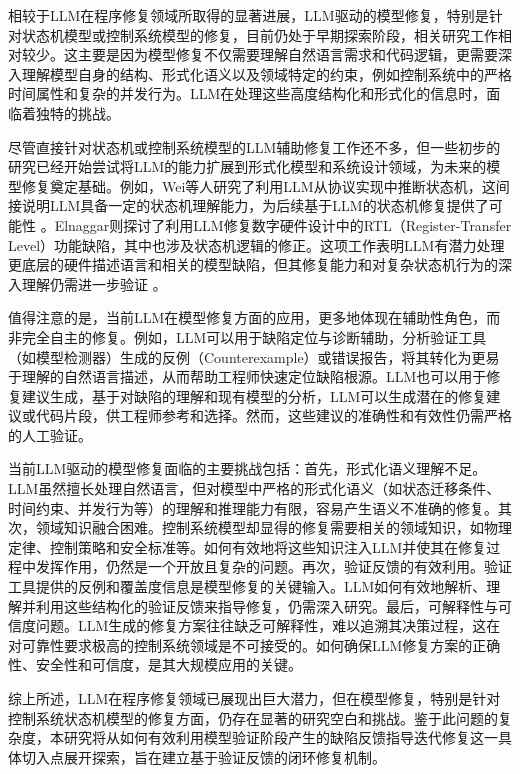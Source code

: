 相较于LLM在程序修复领域所取得的显著进展，LLM驱动的模型修复，特别是针对状态机模型或控制系统模型的修复，目前仍处于早期探索阶段，相关研究工作相对较少。这主要是因为模型修复不仅需要理解自然语言需求和代码逻辑，更需要深入理解模型自身的结构、形式化语义以及领域特定的约束，例如控制系统中的严格时间属性和复杂的并发行为。LLM在处理这些高度结构化和形式化的信息时，面临着独特的挑战。

尽管直接针对状态机或控制系统模型的LLM辅助修复工作还不多，但一些初步的研究已经开始尝试将LLM的能力扩展到形式化模型和系统设计领域，为未来的模型修复奠定基础。例如，Wei等人研究了利用LLM从协议实现中推断状态机，这间接说明LLM具备一定的状态机理解能力，为后续基于LLM的状态机修复提供了可能性 。Elnaggar则探讨了利用LLM修复数字硬件设计中的RTL（Register-Transfer Level）功能缺陷，其中也涉及状态机逻辑的修正。这项工作表明LLM有潜力处理更底层的硬件描述语言和相关的模型缺陷，但其修复能力和对复杂状态机行为的深入理解仍需进一步验证 。

值得注意的是，当前LLM在模型修复方面的应用，更多地体现在辅助性角色，而非完全自主的修复。例如，LLM可以用于缺陷定位与诊断辅助，分析验证工具（如模型检测器）生成的反例（Counterexample）或错误报告，将其转化为更易于理解的自然语言描述，从而帮助工程师快速定位缺陷根源。LLM也可以用于修复建议生成，基于对缺陷的理解和现有模型的分析，LLM可以生成潜在的修复建议或代码片段，供工程师参考和选择。然而，这些建议的准确性和有效性仍需严格的人工验证。

当前LLM驱动的模型修复面临的主要挑战包括：首先，形式化语义理解不足。LLM虽然擅长处理自然语言，但对模型中严格的形式化语义（如状态迁移条件、时间约束、并发行为等）的理解和推理能力有限，容易产生语义不准确的修复。其次，领域知识融合困难。控制系统模型却显得的修复需要相关的领域知识，如物理定律、控制策略和安全标准等。如何有效地将这些知识注入LLM并使其在修复过程中发挥作用，仍然是一个开放且复杂的问题。再次，验证反馈的有效利用。验证工具提供的反例和覆盖度信息是模型修复的关键输入。LLM如何有效地解析、理解并利用这些结构化的验证反馈来指导修复，仍需深入研究。最后，可解释性与可信度问题。LLM生成的修复方案往往缺乏可解释性，难以追溯其决策过程，这在对可靠性要求极高的控制系统领域是不可接受的。如何确保LLM修复方案的正确性、安全性和可信度，是其大规模应用的关键。

综上所述，LLM在程序修复领域已展现出巨大潜力，但在模型修复，特别是针对控制系统状态机模型的修复方面，仍存在显著的研究空白和挑战。鉴于此问题的复杂度，本研究将从如何有效利用模型验证阶段产生的缺陷反馈指导迭代修复这一具体切入点展开探索，旨在建立基于验证反馈的闭环修复机制。

